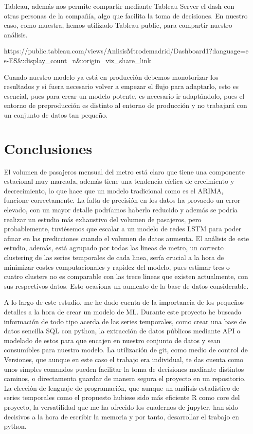 \documentclass[11pt]{article}
\begin{document}
    Tableau, además nos permite compartir mediante Tableau Server el dash
con otras personas de la compañía, algo que facilita la toma de
decisiones. En nuestro caso, como muestra, hemos utilizado Tableau
public, para compartir nuestro análisis.

https://public.tableau.com/views/AnlisisMtrodemadrid/Dashboard1?:language=es-ES\&:display\_count=n\&:origin=viz\_share\_link

    Cuando nuestro modelo ya está en producción debemos monotorizar los
resultados y si fuera necesario volver a empezar el flujo para
adaptarlo, esto es esencial, pues para crear un modelo potente, es
necesario ir adaptándolo, pues el entorno de preproducción es distinto
al entorno de producción y no trabajará con un conjunto de datos tan
pequeño.

    \hypertarget{conclusiones}{%
\section{Conclusiones}\label{conclusiones}}

    El volumen de pasajeros mensual del metro está claro que tiene una
componente estacional muy marcada, además tiene una tendencia cíclica de
crecimiento y decrecimiento, lo que hace que un modelo tradicional como
es el ARIMA, funcione correctamente. La falta de precisión en los datos
ha provacdo un error elevado, con un mayor detalle podríamos haberlo
reducido y además se podría realizar un estudio más exhaustivo del
volumen de pasajeros, pero probablemente, tuviésemos que escalar a un
modelo de redes LSTM para poder afinar en las predicciones cuando el
volumen de datos aumenta. El análisis de este estudio, además, está
agrupado por todas las lineas de metro, un correcto clustering de las
series temporales de cada linea, sería crucial a la hora de minimizar
costes computacionales y rapidez del modelo, pues estimar tres o cuatro
clusters no es comparable con las trece lineas que existen actualmente,
con sus respectivos datos. Esto ocasiona un aumento de la base de datos
considerable.

A lo largo de este estudio, me he dado cuenta de la importancia de los
pequeños detalles a la hora de crear un modelo de ML. Durante este
proyecto he buscado información de todo tipo acerda de las series
temporales, como crear una base de datos sencilla SQL con python, la
extracción de datos públicos mediante API o modelado de estos para que
encajen en nuestro conjunto de datos y sean consumibles para nuestro
modelo. La utilización de git, como medio de control de Versiones, que
aunque en este caso el trabajo era individual, te das cuenta como unos
simples comandos pueden facilitar la toma de decisiones mediante
distintos caminos, o directamenta guardar de manera segura el proyecto
en un repositorio. La elección de lenguaje de programación, que aunque
un análisis estadístico de series temporales como el propuesto hubiese
sido más eficiente R como core del proyecto, la versatilidad que me ha
ofrecido los cuadernos de jupyter, han sido decisivos a la hora de
escribir la memoria y por tanto, desarrollar el trabajo en python.
\end{document}
